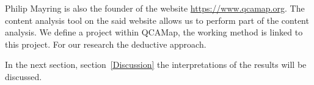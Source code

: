 Philip Mayring is also the founder of the website \url{https://www.qcamap.org}.
The content analysis tool on the said website allows us to perform part of the content analysis.
We define a project within QCAMap, the working method is linked to this project.
For our research the deductive approach.

In the next section, section~\ref{Discussion} the interpretations of the results will be discussed.







